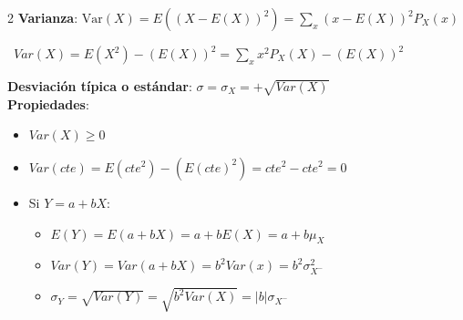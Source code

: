 \documentclass[10pt,a4paper]{article}
\begin{document}
\begin{tcolorbox}[title=Varianza, equal height group=VA4]
    \begin{multicols}{2}
        \textbf{Varianza}: $ \mathrm{Var}(X) = E({(X - E(X))}^2) = \sum\limits_{x}{{(x - E(X))}^2 P_X(x)} $ \\
        {\raggedleft\ $Var(X) = E(X^2) - (E(X))^2 = \sum\limits_x{x^2P_X(X) - (E(X))^2 }$ \par}
        \textbf{Desviación típica o estándar}: $ \sigma = \sigma_X = +\sqrt{Var(X)} $ \\
        \textbf{Propiedades}:
        \begin{itemize}
            \item $Var(X) \geq 0$
            \item $Var(\textit{cte}) = E(\textit{cte}^2) - ({E(\textit{cte})}^2) = \textit{cte}^2 - \textit{cte}^2 = 0$
            \item Si $Y = a + bX$:
            \begin{itemize}
                \item $E(Y) = E(a + bX) = a + bE(X) = a + b\mu_X$
                \item $Var(Y) = Var(a + bX) = b^2Var(x) = b^2\sigma_{X^-}^2$
                \item $\sigma_Y = \sqrt{Var(Y)} = \sqrt{b^2Var(X)} = |b|\sigma_{X^-}$
            \end{itemize}
        \end{itemize}
    \end{multicols}
    \vspace*{5pt}
\end{tcolorbox}

\end{document}
